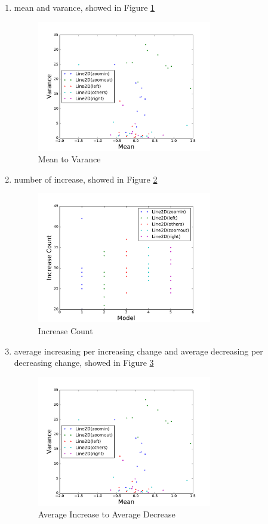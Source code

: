 \documentclass[conference]{IEEEtran}
\begin{document}
\begin{enumerate}
	\item mean and varance, showed in Figure \ref{min-var}
	\begin{figure}[H]
	\label{min-var}
	\centering
	\includegraphics[width=3in]{fs7.pdf}
	\caption{Mean to Varance}
	\end{figure}

	\item number of increase, showed in Figure \ref{inc-count}
	\begin{figure}[H]
	\label{inc-count}
	\centering
	\includegraphics[width=3in]{fs8.pdf}
	\caption{Increase Count}
	\end{figure}

	\item average increasing per increasing change and average decreasing per decreasing change, showed in Figure \ref{avg-inc-dec}
	\begin{figure}[H]
	\label{avg-inc-dec}
	\centering
	\includegraphics[width=3in]{fs7.pdf}
	\caption{Average Increase to Average Decrease}
	\end{figure}

\end{enumerate}
\end{document}
